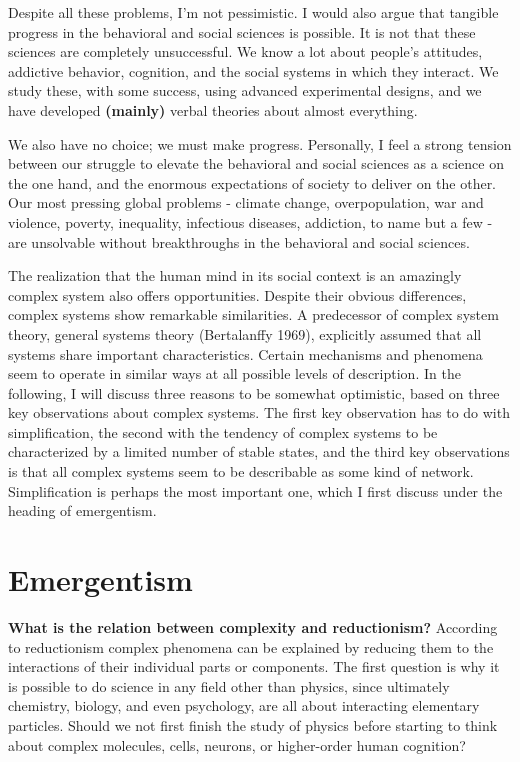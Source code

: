 \documentclass[
  letterpaper,
]{scrbook}
\begin{document}
Despite all these problems, I'm not pessimistic. I would also argue that
tangible progress in the behavioral and social sciences is possible. It
is not that these sciences are completely unsuccessful. We know a lot
about people's attitudes, addictive behavior, cognition, and the social
systems in which they interact. We study these, with some success, using
advanced experimental designs, and we have developed \textbf{(mainly)}
verbal theories about almost everything.

We also have no choice; we must make progress. Personally, I feel a
strong tension between our struggle to elevate the behavioral and social
sciences as a science on the one hand, and the enormous expectations of
society to deliver on the other. Our most pressing global problems -
climate change, overpopulation, war and violence, poverty, inequality,
infectious diseases, addiction, to name but a few - are unsolvable
without breakthroughs in the behavioral and social sciences.

The realization that the human mind in its social context is an
amazingly complex system also offers opportunities. Despite their
obvious differences, complex systems show remarkable similarities. A
predecessor of complex system theory, general systems theory
(Bertalanffy 1969), explicitly assumed that all systems share important
characteristics. Certain mechanisms and phenomena seem to operate in
similar ways at all possible levels of description. In the following, I
will discuss three reasons to be somewhat optimistic, based on three key
observations about complex systems. The first key observation has to do
with simplification, the second with the tendency of complex systems to
be characterized by a limited number of stable states, and the third key
observations is that all complex systems seem to be describable as some
kind of network. Simplification is perhaps the most important one, which
I first discuss under the heading of emergentism.

\hypertarget{emergentism}{%
\section{Emergentism}\label{emergentism}}

\textbf{What is the relation between complexity and reductionism?}
According to reductionism complex phenomena can be explained by reducing
them to the interactions of their individual parts or components. The
first question is why it is possible to do science in any field other
than physics, since ultimately chemistry, biology, and even psychology,
are all about interacting elementary particles. Should we not first
finish the study of physics before starting to think about complex
molecules, cells, neurons, or higher-order human cognition?
\end{document}
